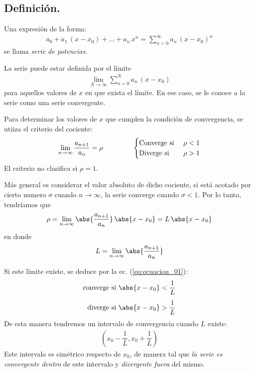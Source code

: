 \subsection{Definición.}

Una expresión de la forma:
\begin{align}
a_{0} + a_{1} \, (x - x_{0}) + \ldots + a_{n} \, x^{n} = \sum_{n=0}^{\infty} a_{n} \, (x - x_{0})^{n}
\label{eq:ecuacion_01}    
\end{align}
se llama \textit{serie de potencias}.
\par
La serie puede estar definida por el límite
\begin{align*}
\lim_{N \to \infty} \sum_{n=0}^{N} a_{n} \, (x - x_{0})
\end{align*}
para aquellos valores de $x$ en que exista el límite. En ese caso, se le conoce a la serie como una serie convergente.
\par
Para determinar los valores de $x$ que cumplen la condición de convergencia, se utiiza el criterio del cociente:
\begin{align*}
\lim_{n \to \infty} \dfrac{a_{n+1}}{a_{n}} = \rho \hspace{1.5cm} \begin{cases}
\mbox{Converge si } & \rho < 1 \\
\mbox{Diverge si } & \rho > 1
\end{cases}
\end{align*}
El criterio no clasifica si $\rho = 1$.
\par
Más general es considerar el valor absoluto de dicho cociente, si está acotado por cierto numero $\sigma$ cuando $n \to \infty$, la serie converge cuando $\sigma < 1$. Por lo tanto, tendríamos que
\begin{align*}
\rho = \lim_{n \to \infty} \abs{\dfrac{a_{n+1}}{a_{n}}} \, \abs{x - x_{0}} = L \, \abs{x - x_{0}}
\end{align*}
en donde
\begin{align*}
L = \lim_{n \to \infty} \abs{\dfrac{a_{n+1}}{a_{n}}}
\end{align*}
\par
Si este límite existe, se deduce por la ec. (\ref{eq:ecuacion_01}):
\begin{align}
\begin{aligned}        
\mbox{converge si } &\abs{x - x_{0}} < \dfrac{1}{L} \\[0.5em]
\mbox{diverge si } &\abs{x - x_{0}} > \dfrac{1}{L}
\end{aligned}
\label{eq:ecuacion_02}    
\end{align}
De esta manera tendremos un intervalo de convergencia cuando $L$ existe:
\begin{align*}
\left( x_{0} - \dfrac{1}{L}, x_{0} + \dfrac{1}{L} \right)
\end{align*}
Este intervalo es simétrico respecto de $x_{0}$, de manera tal que \emph{la serie es convergente dentro} de este intervalo y \emph{divergente fuera} del mismo.

